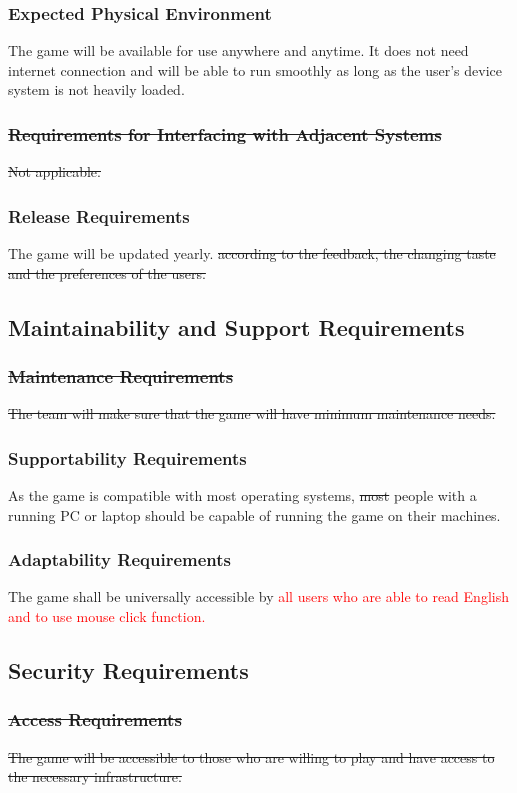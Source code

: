 \documentclass{article}
\begin{document}
\subsubsection{Expected Physical Environment}
The game will be available for use anywhere and anytime. It does not need internet connection and will be able to run smoothly as long as the user’s device system is not heavily loaded.
{\subsubsection{\sout{Requirements for Interfacing with Adjacent Systems}}
\st{Not applicable.}
\subsubsection{Release Requirements}
The game will be updated yearly.\st{ according to the feedback, the changing taste and the preferences of the users.}

\subsection{Maintainability and Support Requirements}
\subsubsection{\sout{ Maintenance Requirements}}
\st{The team will make sure that the game will have minimum maintenance needs.}
\subsubsection{Supportability Requirements}
As the game is compatible with most operating systems, \st{most} people with a running PC or laptop should be capable of running the game on their machines.
\subsubsection{Adaptability Requirements}
The game shall be universally accessible by \textcolor{red}{all users who are able to read English and to use mouse click function.} 

\subsection{Security Requirements}
\subsubsection{\sout{Access Requirements}}
\st{The game will be accessible to those who are willing to play and have access to the necessary infrastructure. }
}
\end{document}
